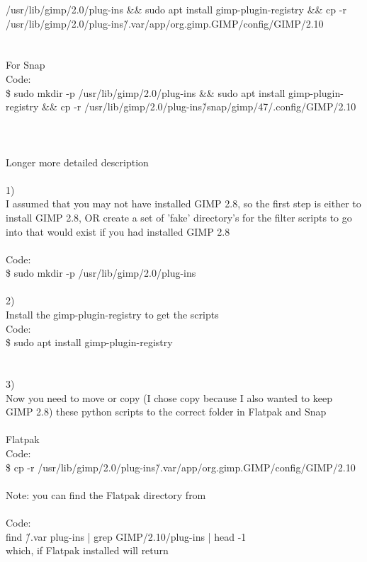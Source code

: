 \documentclass[10pt,a4paper]{article}
\begin{document}
{{{{{{{{{{{{{{{/usr/lib/gimp/2.0/plug-ins \&\& sudo apt install gimp-plugin-registry \&\& cp -r /usr/lib/gimp/2.0/plug-ins\~/.var/app/org.gimp.GIMP/config/GIMP/2.10\\
\\
\\
For Snap\\
Code:\\
\$ sudo mkdir -p /usr/lib/gimp/2.0/plug-ins \&\& sudo apt install gimp-plugin-registry \&\& cp -r /usr/lib/gimp/2.0/plug-ins\~/snap/gimp/47/.config/GIMP/2.10\\
\\
\\
\\
Longer more detailed description\\
\\
1)  \\
I assumed that you may not have installed GIMP 2.8, so the first step is either to install GIMP 2.8, OR create a set of 'fake' directory's for the filter scripts to go into that would exist if you had installed GIMP 2.8\\
\\
Code:\\
\$ sudo mkdir -p /usr/lib/gimp/2.0/plug-ins\\
\\
2)\\
Install the gimp-plugin-registry to get the scripts\\
Code:\\
\$ sudo apt install gimp-plugin-registry\\
\\
\\
3)\\
Now you need to move or copy (I chose copy because I also wanted to keep GIMP 2.8) these python scripts to the correct folder in Flatpak and Snap\\
\\
Flatpak\\
Code:\\
\$ cp -r /usr/lib/gimp/2.0/plug-ins\~/.var/app/org.gimp.GIMP/config/GIMP/2.10\\
\\
Note: you can find the Flatpak directory from\\
\\
Code:\\
find \~/.var plug-ins | grep GIMP/2.10/plug-ins | head -1\\
which, if Flatpak installed will return\\
}}}}}}}}}}}}}}}
\end{document}
